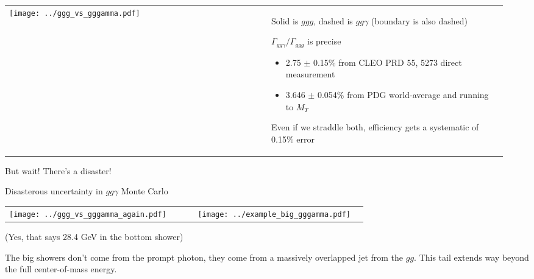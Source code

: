 \documentclass[landscape]{article}
\begin{document}
\begin{tabular}{p{0.5\linewidth} p{0.45\linewidth}}
  \begin{minipage}{\linewidth}
    \texttt{[image: ../ggg\_vs\_gggamma.pdf]}
  \end{minipage} &
  \begin{minipage}{\linewidth}
    Solid is $ggg$, dashed is $gg\gamma$ (boundary is also dashed)

    \vspace{1 cm}
    $\Gamma_{gg\gamma}/\Gamma_{ggg}$ is precise
    \begin{itemize}
      \item 2.75 $\pm$ 0.15\% from CLEO PRD 55, 5273 direct measurement

      \item 3.646 $\pm$ 0.054\% from PDG world-average and running to $M_\Upsilon$
    \end{itemize}

    \vspace{1 cm}
    Even if we straddle both, efficiency gets a systematic of 0.15\% error

  \end{minipage}
\end{tabular}

\vfill

\begin{center} But wait!  There's a disaster! \end{center}

\vfill

\pagebreak

Disasterous uncertainty in $gg\gamma$ Monte Carlo

\begin{tabular}{p{0.5\linewidth} p{0.45\linewidth}}
  \texttt{[image: ../ggg\_vs\_gggamma\_again.pdf]} &
  \texttt{[image: ../example\_big\_gggamma.pdf]}
\end{tabular}

\vfill

\begin{flushright} (Yes, that says 28.4 GeV in the bottom shower) \end{flushright}

\vfill

The big showers don't come from the prompt photon, they come from a
massively overlapped jet from the $gg$.  This tail extends way beyond
the full center-of-mass energy.

\vfill
\end{document}
